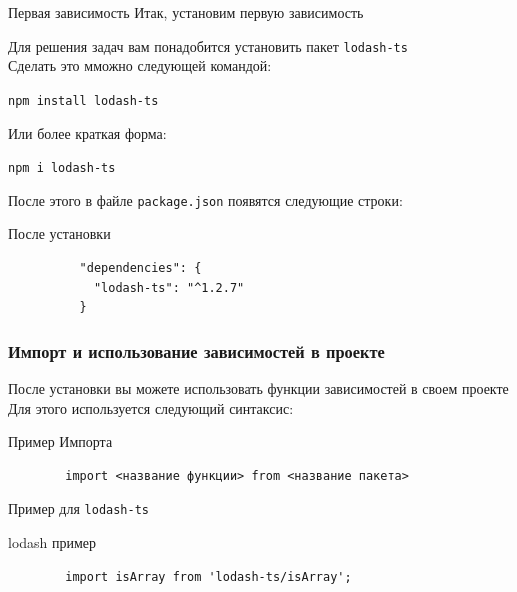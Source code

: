 \documentclass[aspectratio=169]{beamer}
\begin{document}
  \begin{frame}{Первая зависимость}
    Итак, установим первую зависимость

    \bigskip

    
    Для решения задач вам понадобится установить пакет \texttt{lodash-ts} \\ Сделать это мможно следующей командой:

    \bigskip
 
    \begin{center}
  \texttt{npm install lodash-ts}


    \bigskip

    Или более краткая форма:

    
    \bigskip
 
    \texttt{npm i lodash-ts}
    
    \end{center}

    \framebreak

    \begin{center}
      После этого в файле \texttt{package.json} появятся следующие строки:
      \begin{block}{После установки}
        
        \begin{verbatim}
          "dependencies": {
            "lodash-ts": "^1.2.7"
          }  
        \end{verbatim}
        
      \end{block}
    \end{center}
  \end{frame}


  \begin{frame}[fragile]
    \frametitle{Импорт и использование зависимостей в проекте}
    После установки вы можете использовать функции зависимостей в своем проекте
    \\
    Для этого используется следующий синтаксис:

    \begin{block}{Пример Импорта}
      \begin{verbatim}
        import <название функции> from <название пакета>
      \end{verbatim}
    \end{block}
    \begin{center}
      Пример для \texttt{lodash-ts}
    \end{center}
    \begin{block}{lodash пример}
      \begin{verbatim}
        import isArray from 'lodash-ts/isArray';
      \end{verbatim}
    \end{block}
  \end{frame}
  
\end{document}
